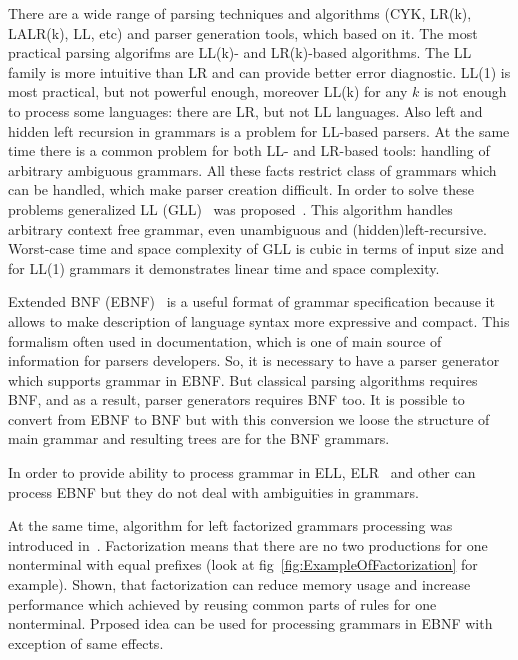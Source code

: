 \documentclass[runningheads,a4paper]{llncs}
\begin{document}
There are a wide range of parsing techniques and algorithms (CYK, LR(k), LALR(k), LL, etc) and parser generation tools, which based on it. 
The most practical parsing algorifms are LL(k)- and LR(k)-based algorithms.
The LL family is more intuitive than LR and can provide better error diagnostic.
LL(1) is most practical, but not powerful enough, moreover LL(k) for any $k$ is not enough to process some languages: there are LR, but not LL languages.
Also left and hidden left recursion in grammars is a problem for LL-based parsers.
At the same time there is a common problem for both LL- and LR-based tools: handling of arbitrary ambiguous grammars.
All these facts restrict class of grammars which can be handled, which make parser creation difficult. 
In order to solve these problems generalized LL (GLL)~\cite{scott2010gll} was proposed~\cite{scott2010gll}. 
This algorithm handles arbitrary context free grammar, even unambiguous and (hidden)left-recursive.
Worst-case time and space complexity of GLL is cubic in terms of input size and for LL(1) grammars it demonstrates linear time and space complexity.

Extended BNF (EBNF)~\cite{EBNFISO} is a useful format of grammar specification because it allows to make description of language syntax more expressive and compact. 
This formalism often used in documentation, which is one of main source of information for parsers developers.
So, it is necessary to have a parser generator which supports grammar in EBNF.
But classical parsing algorithms requires BNF, and as a result, parser generators requires BNF too.
It is possible to convert from EBNF to BNF but with this conversion we loose the structure of main grammar and resulting trees are for the BNF grammars.

In order to provide ability to process grammar in ELL, ELR~\cite{AttributedELL,ELRR,ECFGparsing,ELLParser,ELL,ECFG,ELALR,ELRParsing} and other can process EBNF but they do not deal with ambiguities in grammars.

At the same time, algorithm for left factorized grammars processing was introduced in~\cite{scott2016structuring}.
Factorization means that there are no two productions for one nonterminal with equal prefixes (look at fig~\ref{fig:ExampleOfFactorization} for example).
Shown, that factorization can reduce memory usage and increase performance which achieved by reusing common parts of rules for one nonterminal.
Prposed idea can be used for processing grammars in EBNF with exception of same effects.
\end{document}
